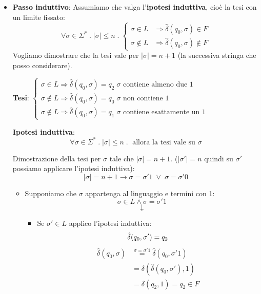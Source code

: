 \documentclass[a4paper]{article}
\begin{document}
\begin{example}
\begin{itemize}
    \item \textbf{Passo induttivo}: Assumiamo che valga l'\textbf{ipotesi induttiva}, cioè
      la tesi con un limite fissato:
      \[
        \forall \sigma \in \Sigma^* \;.\; \left| \sigma  \right| \le n \;.\;
        \begin{cases}
          \sigma \in L &\Rightarrow \hat{\delta}(q_0, \sigma) \in F\\
          \sigma \notin L &\Rightarrow \hat{\delta}(q_0, \sigma) \notin F
        \end{cases}
      \] 
      Vogliamo dimostrare che la tesi vale per \( \left| \sigma  \right| = n + 1 \)
      (la successiva stringa che posso considerare).

      \noindent
      \textbf{Tesi}:
      \( 
        \begin{cases}
          \sigma \in L \Rightarrow \hat{\delta}(q_0,\sigma) = q_2
          \; \sigma \text{ contiene almeno due 1}\\
          \sigma \notin L \Rightarrow \hat{\delta}(q_0,\sigma) = q_0
          \; \sigma \text{ non contiene 1}\\
          \sigma \notin L \Rightarrow \hat{\delta}(q_0,\sigma) = q_1
          \; \sigma \text{ contiene esattamente un 1}
        \end{cases}
      \) 

      \vspace{1em}
      \noindent
      \textbf{Ipotesi induttiva}:
      \[
        \forall \sigma \in \Sigma^* \;.\; \left| \sigma  \right| \le n \;.\;
        \text{ allora la tesi vale su } \sigma
      \] 

      \vspace{1em}
      \noindent
      Dimostrazione della tesi per \( \sigma  \) tale che \( \left| \sigma  \right| = n + 1 \).
      (\( \left| \sigma' \right| = n \) quindi su \( \sigma' \) possiamo applicare l'ipotesi
      induttiva):
      \[
        \left| \sigma  \right| = n + 1 \to 
          \sigma = \sigma'1 \; \vee \; \sigma = \sigma'0
      \] 
      \begin{itemize}
        \item Supponiamo che \( \sigma  \) appartenga al linguaggio e termini con 1:
          \[
            \sigma \in L \wedge \sigma  = \sigma'1
          \] 
          \[
            \downarrow
          \] 
          \begin{itemize}
            \item Se \( \sigma' \in L \) applico l'ipotesi induttiva:
              \[
                  \hat{\delta}(q_0, \sigma') = q_2\\
              \] 
              \[
                \begin{aligned}
                  \hat{\delta}(q_0, \sigma) &\stackrel{\sigma = \sigma'1}{=}
                  \hat{\delta}(q_0, \sigma'1)\\
                                            &= \delta(\hat{\delta}(q_0, \sigma'), 1)\\
                                            &= \delta(q_2, 1) = q_2 \in F
                \end{aligned}
              \] 


\end{itemize}
\end{itemize}
\end{itemize}
\end{example}
\end{document}
